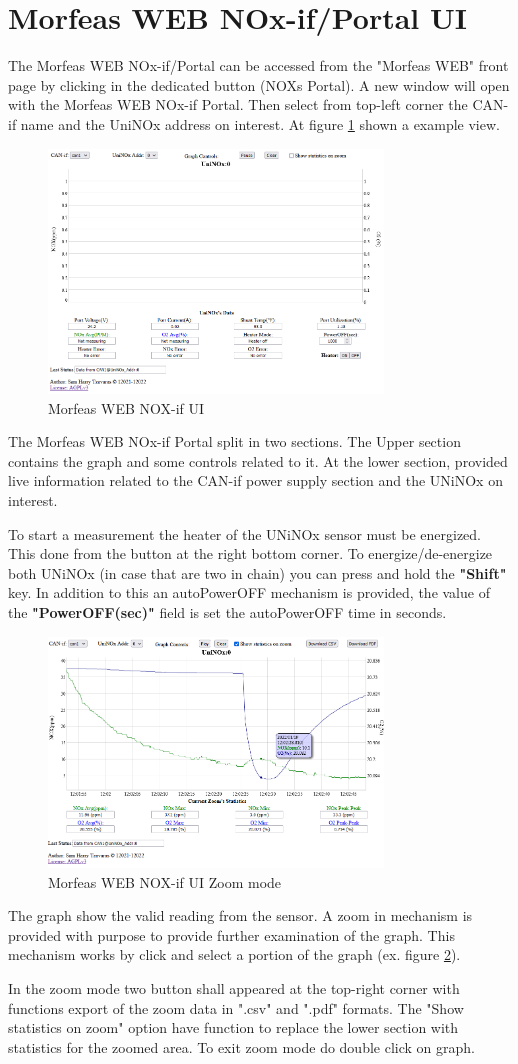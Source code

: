 \section{Morfeas WEB NOx-if/Portal UI}
The Morfeas WEB NOx-if/Portal can be accessed from the "Morfeas WEB" front page by clicking in the dedicated button (NOXs Portal).
A new window will open with the Morfeas WEB NOx-if Portal.
Then select from top-left corner the CAN-if name and the UniNOx address on interest.
At figure \ref{fig:NOX-if_UI} shown a example view.

\begin{figure}[h]
\centering
	\includegraphics[width=3.5in,angle=0]{../art/Morfeas_web_if/Morfeas_web_NOX_if_UI.png}
	\caption{Morfeas WEB NOX-if UI}
	\label{fig:NOX-if_UI}
\end{figure}

The Morfeas WEB NOx-if Portal split in two sections. The Upper section contains the graph and some controls related to it.
At the lower section, provided live information related to the CAN-if power supply section and the UNiNOx on interest.

To start a measurement the heater of the UNiNOx sensor must be energized. This done from the button at the right bottom corner.
To energize/de-energize both UNiNOx (in case that are two in chain) you can press and hold the \textbf{"Shift"} key.
In addition to this an autoPowerOFF mechanism is provided, the value of the \textbf{"PowerOFF(sec)"} field is set the autoPowerOFF time in seconds.
\begin{figure}[h]
\centering
	\includegraphics[width=3.5in,angle=0]{../art/Morfeas_web_if/Morfeas_web_NOX_if_UI_zoom.png}
	\caption{Morfeas WEB NOX-if UI Zoom mode}
	\label{fig:NOX-if_UI_zoom}
\end{figure}
The graph show the valid reading from the sensor. A zoom in mechanism is provided with purpose to provide further examination of the graph.
This mechanism works by click and select a portion of the graph (ex. figure \ref{fig:NOX-if_UI_zoom}).

In the zoom mode two button shall appeared at the top-right corner with functions export of the zoom data in ".csv" and ".pdf" formats.
The "Show statistics on zoom" option have function to replace the lower section with statistics for the zoomed area.
To exit zoom mode do double click on graph.